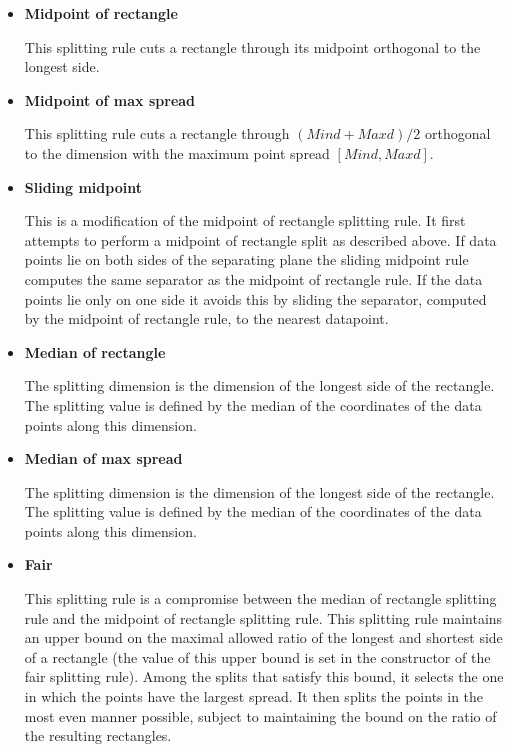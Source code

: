 \begin{itemize}

\item {\bf Midpoint of rectangle}

This splitting rule cuts a rectangle through its midpoint orthogonal
to the longest side.

\item {\bf Midpoint of max spread}

This splitting rule cuts a rectangle through $(Mind+Maxd)/2$ orthogonal
to the dimension with the maximum point spread $[Mind,Maxd]$.

\item {\bf Sliding midpoint}

This is a modification of the midpoint of rectangle splitting rule.
It first attempts to perform a midpoint of rectangle split as
described above. If data points lie on both sides of the separating
plane the sliding midpoint rule computes the same separator as
the midpoint of rectangle rule. If the data points lie only on one
side it avoids this by sliding the separator, computed by
the midpoint of rectangle rule, to the nearest datapoint.

\item {\bf Median of rectangle}

The splitting dimension is the dimension of the longest side of the rectangle.
The splitting value is defined by the median of the coordinates of the data points
along this dimension.

\item {\bf Median of max spread}

The splitting dimension is the dimension of the longest side of the rectangle.
The splitting value is defined by the median of the coordinates of the data points
along this dimension.

\item {\bf Fair}

This splitting rule is a compromise between the median of rectangle splitting rule
and the midpoint of rectangle splitting rule. This splitting rule maintains an upper
bound on the maximal allowed ratio of the longest and shortest side of
a rectangle (the value of this upper bound is set in the constructor of the
fair splitting rule). Among the splits that satisfy this bound, it selects
the one in which the points have the largest spread.
It then splits the points in the most even manner possible, subject
to maintaining the bound on the ratio of the resulting rectangles.


\end{itemize}
